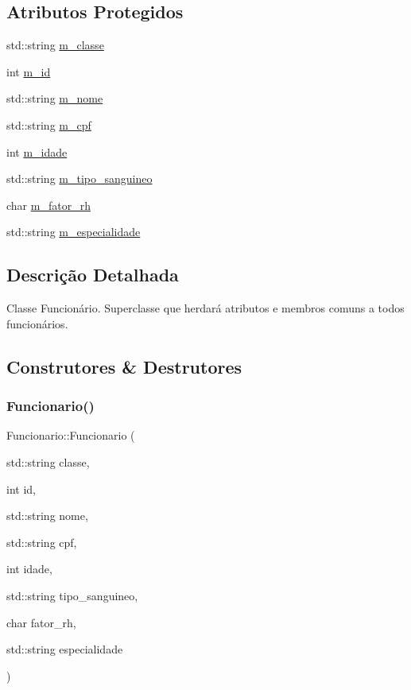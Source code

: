 \subsection*{Atributos Protegidos}
\begin{DoxyCompactItemize}
\item 
std\+::string \hyperlink{classFuncionario_a7777e5ac421a364e2694c909dd1fd4d1}{m\+\_\+classe}
\item 
int \hyperlink{classFuncionario_a123c4af00e4e6eea5d4d9366a8bfefed}{m\+\_\+id}
\item 
std\+::string \hyperlink{classFuncionario_a6d5228656aa32b0f36f02e08c51cd1e4}{m\+\_\+nome}
\item 
std\+::string \hyperlink{classFuncionario_a74bd5f4c71bfb42219f0cce2a72eeb47}{m\+\_\+cpf}
\item 
int \hyperlink{classFuncionario_a542f0ec45dd249452aa6cb3215e9eb09}{m\+\_\+idade}
\item 
std\+::string \hyperlink{classFuncionario_aa09cfc8a989b1a292cd21380a5fcb8bc}{m\+\_\+tipo\+\_\+sanguineo}
\item 
char \hyperlink{classFuncionario_ab8b1fa2c4d830ea6a03c5d1db8ee1002}{m\+\_\+fator\+\_\+rh}
\item 
std\+::string \hyperlink{classFuncionario_ac9ccf61efca75f4130e79ef06b7278a2}{m\+\_\+especialidade}
\end{DoxyCompactItemize}


\subsection{Descrição Detalhada}
Classe Funcionário. Superclasse que herdará atributos e membros comuns a todos funcionários. 

\subsection{Construtores \& Destrutores}
\mbox{\label{classFuncionario_a16417baaad7842cbbf9970a4f677d3bc}} 
\subsubsection{\texorpdfstring{Funcionario()}{Funcionario()}}
{\footnotesize\ttfamily Funcionario\+::\+Funcionario (\begin{DoxyParamCaption}\item[{std\+::string}]{classe,  }\item[{int}]{id,  }\item[{std\+::string}]{nome,  }\item[{std\+::string}]{cpf,  }\item[{int}]{idade,  }\item[{std\+::string}]{tipo\+\_\+sanguineo,  }\item[{char}]{fator\+\_\+rh,  }\item[{std\+::string}]{especialidade }\end{DoxyParamCaption})}

